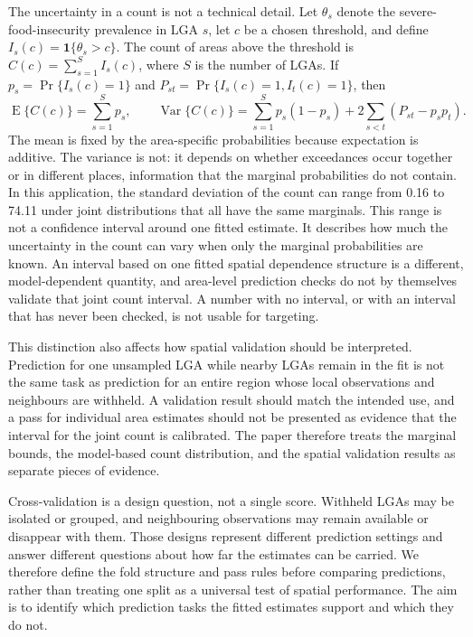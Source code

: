 The uncertainty in a count is not a technical detail. Let \(\theta_s\) denote the severe-food-insecurity prevalence in LGA \(s\), let \(c\) be a chosen threshold, and define \(I_s(c)=\mathbf{1}\{\theta_s>c\}\). The count of areas above the threshold is \(C(c)=\sum_{s=1}^{S}I_s(c)\), where \(S\) is the number of LGAs. If \(p_s=\Pr\{I_s(c)=1\}\) and \(P_{st}=\Pr\{I_s(c)=1,I_t(c)=1\}\), then
\[
  \operatorname{E}\{C(c)\}=\sum_{s=1}^{S}p_s,\qquad
  \operatorname{Var}\{C(c)\}
  =\sum_{s=1}^{S}p_s(1-p_s)
    +2\sum_{s<t}\left(P_{st}-p_sp_t\right).
\]
The mean is fixed by the area-specific probabilities because expectation is additive. The variance is not: it depends on whether exceedances occur together or in different places, information that the marginal probabilities do not contain. In this application, the standard deviation of the count can range from 0.16 to 74.11 under joint distributions that all have the same marginals. This range is not a confidence interval around one fitted estimate. It describes how much the uncertainty in the count can vary when only the marginal probabilities are known. An interval based on one fitted spatial dependence structure is a different, model-dependent quantity, and area-level prediction checks do not by themselves validate that joint count interval. A number with no interval, or with an interval that has never been checked, is not usable for targeting.

This distinction also affects how spatial validation should be interpreted. Prediction for one unsampled LGA while nearby LGAs remain in the fit is not the same task as prediction for an entire region whose local observations and neighbours are withheld. A validation result should match the intended use, and a pass for individual area estimates should not be presented as evidence that the interval for the joint count is calibrated. The paper therefore treats the marginal bounds, the model-based count distribution, and the spatial validation results as separate pieces of evidence.

Cross-validation is a design question, not a single score. Withheld LGAs may be isolated or grouped, and neighbouring observations may remain available or disappear with them. Those designs represent different prediction settings and answer different questions about how far the estimates can be carried. We therefore define the fold structure and pass rules before comparing predictions, rather than treating one split as a universal test of spatial performance. The aim is to identify which prediction tasks the fitted estimates support and which they do not.

